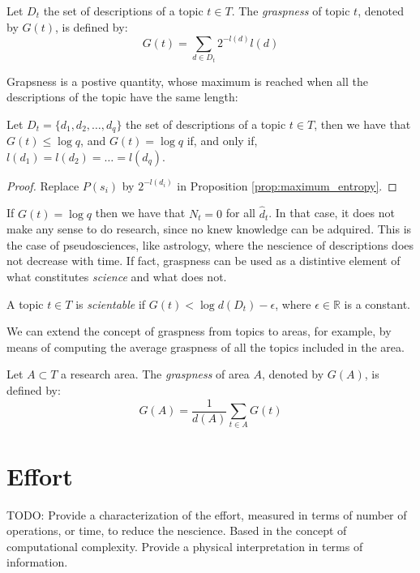\begin{definition}[Graspness]
Let $D_t$ the set of descriptions of a topic $t \in T$. The \emph{graspness} of topic $t$, denoted by $G(t)$, is defined by:
\[
G(t) = \sum_{d \in D_t} 2^{-l(d)} l(d)
\]
\end{definition}

Grapsness is a postive quantity, whose maximum is reached when all the descriptions of the topic have the same length:

\begin{proposition}
Let $D_t = \{ d_1, d_2, \ldots, d_q \}$ the set of descriptions of a topic $t \in T$, then we have that $G(t) \leq \log q$, and $G(t) = \log q$ if, and only if, $l(d_1) = l(d_2) = \ldots = l(d_q)$.
\end{proposition}
\begin{proof}
Replace $P(s_i)$ by $2^{-l(d_i)}$ in Proposition \ref{prop:maximum_entropy}.
\end{proof}

If $G(t) = \log q$ then we have that $N_t = 0$ for all $\hat{d}_t$. In that case, it does not make any sense to do research, since no knew knowledge can be adquired. This is the case of pseudosciences, like astrology, where the nescience of descriptions does not decrease with time. If fact, graspness can be used as a distintive element of what constitutes \emph{science} and what does not.

\begin{definition}
A topic $t \in T$ is \emph{scientable} if $G(t) < \log d(D_t) - \epsilon$, where $\epsilon \in \mathbb{R}$ is a constant.
\end{definition}

We can extend the concept of graspness from topics to areas, for example, by means of computing the average graspness of all the topics included in the area.

\begin{definition}
Let $A \subset T$ a research area. The \emph{graspness} of area $A$, denoted by $G(A)$, is defined by:
\[
G(A) = \frac{1}{d(A)} \sum_{t \in A} G(t)
\]
\end{definition}

%
%
\section{Effort}

{\color{red} TODO: Provide a characterization of the effort, measured in terms of number of operations, or time, to reduce the nescience. Based in the concept of computational complexity. Provide a physical interpretation in terms of information.}

